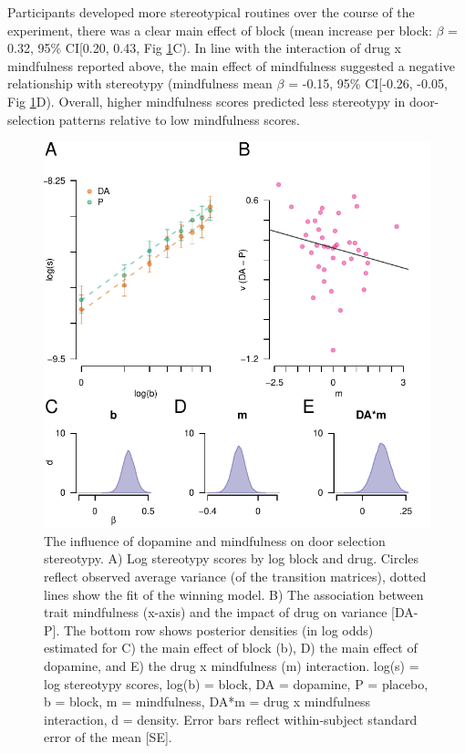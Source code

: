 \documentclass[
  man]{apa6}
\begin{document}
Participants developed more stereotypical routines over the course of the experiment, there was a clear main effect of block (mean increase per block: \(\beta\) = 0.32, 95\% CI{[}0.20, 0.43, Fig \ref{fig:stereofig}C). In line with the interaction of drug x mindfulness reported above, the main effect of mindfulness suggested a negative relationship with stereotypy (mindfulness mean \(\beta\) = -0.15, 95\% CI{[}-0.26, -0.05, Fig \ref{fig:stereofig}D). Overall, higher mindfulness scores predicted less stereotypy in door-selection patterns relative to low mindfulness scores.

\begin{figure}

{\centering \includegraphics[width=0.7\linewidth]{../../images/s_fig} 

}

\caption{The influence of dopamine and mindfulness on door selection stereotypy. A) Log stereotypy scores by log block and drug. Circles reflect observed average variance (of the transition matrices), dotted lines show the fit of the winning model. B) The association between trait mindfulness (x-axis) and the impact of drug on variance [DA-P]. The bottom row shows posterior densities (in log odds) estimated for C) the main effect of block (b), D) the main effect of dopamine, and E) the drug x mindfulness (m) interaction. log(s) = log stereotypy scores, log(b) = block, DA = dopamine, P = placebo, b = block, m = mindfulness, DA*m = drug x mindfulness interaction, d = density. Error bars reflect within-subject standard error of the mean [SE].}\label{fig:stereofig}
\end{figure}
\end{document}
